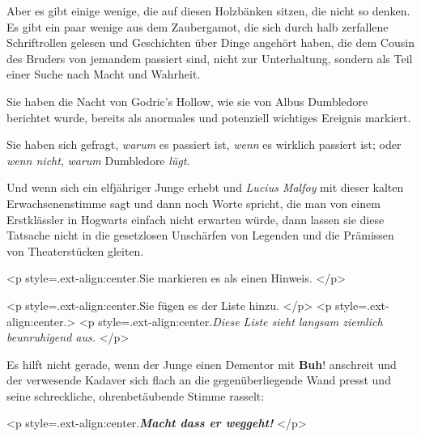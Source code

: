 Aber es gibt einige wenige, die auf diesen Holzbänken sitzen, die nicht so
denken. Es gibt ein paar wenige aus dem Zaubergamot, die sich durch halb
zerfallene Schriftrollen gelesen und Geschichten über Dinge angehört haben, die
dem Cousin des Bruders von jemandem passiert sind, nicht zur Unterhaltung,
sondern als Teil einer Suche nach Macht und Wahrheit.

Sie haben die Nacht von Godric's Hollow, wie sie von Albus Dumbledore berichtet
wurde, bereits als anormales und potenziell wichtiges Ereignis markiert.

Sie haben sich gefragt, \emph{warum} es passiert ist, \emph{wenn} es wirklich
passiert ist; oder \emph{wenn nicht}, \emph{warum} Dumbledore \emph{lügt}.

Und wenn sich ein elfjähriger Junge erhebt und \emph{\glqq Lucius Malfoy\grqq{}
} mit dieser kalten Erwachsenenstimme sagt und dann noch Worte spricht, die man
von einem Erstklässler in Hogwarts einfach nicht erwarten würde, dann lassen sie
diese Tatsache nicht in die gesetzlosen Unschärfen von Legenden und die
Prämissen von Theaterstücken gleiten.

<p style=\grqq{}.ext-align:center\grqq{}.Sie markieren es als einen Hinweis.
</p>

<p style=\grqq{}.ext-align:center\grqq{}.Sie fügen es der Liste hinzu. </p> <p
style=\grqq{}.ext-align:center\grqq{}.> <p
style=\grqq{}.ext-align:center\grqq{}.\emph{Diese Liste sieht langsam ziemlich
beunruhigend aus. }</p>


Es hilft nicht gerade, wenn der Junge einen Dementor mit \glqq
\textbf{Buh}!\grqq{} anschreit und der verwesende Kadaver sich flach an die
gegenüberliegende Wand presst und seine schreckliche, ohrenbetäubende Stimme
rasselt:

<p style=\grqq{}.ext-align:center\grqq{}.\textbf{\emph{\glqq Macht dass er
weggeht!\grqq{} }}</p>

